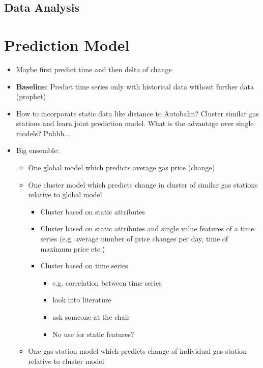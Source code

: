 \documentclass[%
a4paper,
DIV12,
2.5headlines,
bigheadings,
titlepage,
openbib,
]{scrartcl}
\begin{document}
\subsection{Data Analysis}\label{data-analysis}



\section{Prediction Model}\label{prediction-model}
\begin{itemize}
\item Maybe first predict time and then delta of change\\
\item \textbf{Baseline}: Predict time series only with historical data without further data (prophet)\\
\item How to incorporate static data like distance to Autobahn? Cluster similar gas stations and learn joint prediction model. 
What is the advantage over single models? Puhhh...\\
\item Big ensemble:

\begin{itemize}
\item One global model which predicts average gas price (change)
\item One cluster model which predicts change in cluster of similar gas stations relative to global model

\begin{itemize}
\item Cluster based on static attributes
\item Cluster based on static attributes and single value features of a time series (e.g. average number of price changes per day, time of maximum price etc.)
\item Cluster based on time series 

\begin{itemize}
\item e.g. correlation between time series
\item look into literature
\item ask someone at the chair
\item No use for static features?
\end{itemize}
\end{itemize}

\item One gas station model which predicts change of individual gas station relative to cluster model
\end{itemize}
\end{itemize}
\end{document}
